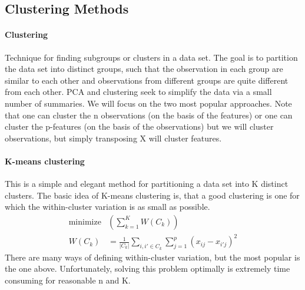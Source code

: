 \documentclass[../document.tex]{subfiles}
\begin{document}
	\sectionbreak
	\subsection{Clustering Methods}

	\paragraph{Clustering}
	Technique for finding subgroups or clusters in a data set. The goal is to partition the data set into distinct groups, such that the observation in each group are similar to each other and observations from different groups are quite different from each other. PCA and clustering seek to simplify the data via a small number of summaries. We will focus on the two most popular approaches. Note that one can cluster the n observations (on the basis of the features) or one can cluster the p-features (on the basis of the observations) but we will cluster observations, but simply transposing X will cluster features.

	\paragraph{K-means clustering}
	This is a simple and elegant method for partitioning a data set into K distinct clusters. The basic idea of K-means clustering is, that a good clustering is one for which the within-cluster variation is as small as possible.
	\begin{equation}
	\begin{split}
		\text{minimize}&\left(\sum_{k=1}^{K}W(C_{k})\right)\\
		W(C_{k})&=\frac{1}{|C_{k}|}\sum_{i,i'\in C_{k}}\sum_{j=1}^{p}(x_{ij}-x_{i'j})^2
	\end{split}
	\end{equation}
	There are many ways of defining within-cluster variation, but the most popular is the one above. Unfortunately, solving this problem optimally is extremely time consuming for reasonable n and K.
\end{document}
